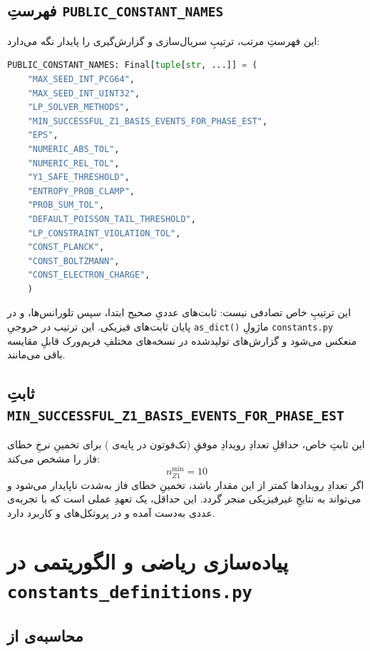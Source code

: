 \subsection{فهرستِ \texttt{PUBLIC\_CONSTANT\_NAMES}}

این فهرستِ مرتب، ترتیبِ سریال‌سازی و گزارش‌گیری را پایدار نگه می‌دارد:

\begin{lstlisting}[language=Python]
	PUBLIC_CONSTANT_NAMES: Final[tuple[str, ...]] = (
	"MAX_SEED_INT_PCG64",
	"MAX_SEED_INT_UINT32",
	"LP_SOLVER_METHODS",
	"MIN_SUCCESSFUL_Z1_BASIS_EVENTS_FOR_PHASE_EST",
	"EPS",
	"NUMERIC_ABS_TOL",
	"NUMERIC_REL_TOL",
	"Y1_SAFE_THRESHOLD",
	"ENTROPY_PROB_CLAMP",
	"PROB_SUM_TOL",
	"DEFAULT_POISSON_TAIL_THRESHOLD",
	"LP_CONSTRAINT_VIOLATION_TOL",
	"CONST_PLANCK",
	"CONST_BOLTZMANN",
	"CONST_ELECTRON_CHARGE",
	)
\end{lstlisting}

این ترتیبِ خاص تصادفی نیست: ثابت‌های عددیِ صحیح ابتدا، سپس تلورانس‌ها، و در پایان ثابت‌های فیزیکی. این ترتیب در خروجیِ \texttt{as\_dict()} ماژولِ \texttt{constants.py} منعکس می‌شود و گزارش‌های تولیدشده در نسخه‌های مختلفِ فریم‌ورک قابلِ مقایسه باقی می‌مانند.

\subsection{ثابتِ \texttt{MIN\_SUCCESSFUL\_Z1\_BASIS\_EVENTS\_FOR\_PHASE\_EST}}

این ثابتِ خاص، حداقلِ تعدادِ رویدادِ موفقِ  (تک‌فوتون در پایه‌ی ) برای تخمینِ نرخِ خطای فاز را مشخص می‌کند:
\begin{equation}
	n_{Z1}^{\min} = 10
\end{equation}
اگر تعدادِ رویدادها کمتر از این مقدار باشد، تخمینِ خطای فاز به‌شدت ناپایدار می‌شود و می‌تواند به نتایجِ غیرفیزیکی منجر گردد. این حداقل، یک تعهدِ عملی است که با تجربه‌ی عددی به‌دست آمده و در پروتکل‌های  و  کاربرد دارد.

\section{پیاده‌سازی ریاضی و الگوریتمی در \texttt{constants\_definitions.py}}

\subsection{محاسبه‌ی  از }

